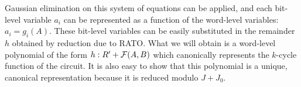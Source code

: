 Gaussian elimination on this system of equations can be 
applied, and each bit-level variable $a_i$ can be represented as a
function of the word-level variables: $a_i = g_i(A)$. These bit-level
variables can be easily substituted in the remainder $h$ obtained by
reduction due to RATO. What we will obtain is a word-level polynomial
of the form $h: R' + {\mathcal{F}}(A, B)$ which canonically represents the
$k$-cycle function of the circuit. It is also easy to show that this
polynomial is a unique, canonical representation because it is reduced
modulo $J + J_0$. 

 
